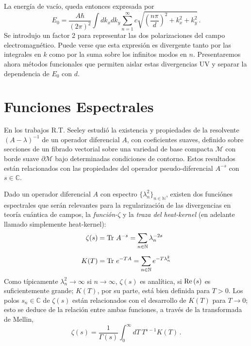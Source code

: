 La energía de vacío, queda entonces expresada por
\begin{equation}
E _0 = \frac{A \hbar }{(2 \pi) ^2} \int dk _x dk _y 
\sum _{n=1} ^{\infty} 
c
\sqrt{
		\left( \frac{n \pi}{d} \right) ^2 + k _x ^2 + k _y ^2
		}\,.
\end{equation}
Se introdujo un factor 2 para representar las dos polarizaciones del campo electromagnético. Puede verse que esta expresión es divergente tanto por las integrales en $k$ como por la suma sobre los infinitos modos en $n$. Presentaremos ahora métodos funcionales que permiten aislar estas divergencias UV y separar la dependencia de $E_0$ con $d$.

\section{Funciones Espectrales}

En los trabajos \cite{Seeley:1967ea,10.2307/2373309,10.2307/2373312} R.T. Seeley estudió la existencia y propiedades de la resolvente $(A - \lambda) ^{-1}$ de un operador diferencial $A$, con coeficientes suaves, definido sobre secciones de un fibrado vectorial sobre una variedad de base compacta $\mathcal{M}$ con borde suave $\partial \mathcal{M}$ bajo determinadas condiciones de contorno. Estos resultados están relacionados con las propiedades del operador pseudo-diferencial $A ^{-s}$ con $s \in \mathbb{C}$.



Dado un operador diferencial $A$ con espectro $\{ \lambda ^2 _n \} _{n \in \mathbb N}$, existen dos funciónes espectrales que serán relevantes para la regularización de las divergencias en teoría cuántica de campos, la {\it  función-$\zeta$} y la  {\it traza del  heat-kernel} (en adelante llamado simplemente heat-kernel):
\begin{align}
\zeta  (s) &= {\rm Tr}\ A ^{-s} = \sum \limits_{n \in \mathbb N}   \lambda _n ^{-2s} \label{funcion.zeta}\\[2mm]
K (T) &=  {\rm Tr} \ e ^{-T A} = \sum \limits_{n \in \mathbb N} e ^{-T \lambda ^2 _{n} }
\end{align}
Como típicamente $\lambda ^2 _n\to \infty$ si $n\to \infty$, $\zeta  (s) $ es analítica, si ${\rm Re}\,(s)$ es suficientemente grande; $K(T)$, por su parte, está bien definida para $T>0$. Los polos $s _n \in\mathbb C$ de $\zeta(s)$ están relacionados con el desarrollo de $K(T)$ para $T\to 0$; esto se deduce de la relación entre ambas funciones, a través de la transformada de Mellin,
\begin{equation}
\zeta (s) = \frac{1}{\Gamma (s) } 
\int _0 ^{\infty} dT \
T^{s-1} K(T) \,.
\label{eq.mellin}
\end{equation}

